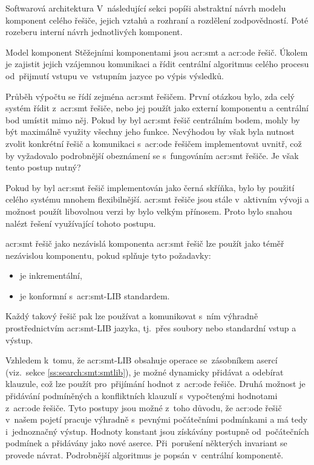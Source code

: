 \documentclass[thesis=M,czech]{FITthesis}[2012/06/26]
\newcommand{\acrlabel}[1]{acr:#1}
\newcommand{\acr}[1]{\acrshort{\acrlabel{#1}}}
\newcommand{\rf}[1]{\ref{#1}}
\begin{document}
\begin{section}{Softwarová architektura}\label{s:design:arch}
V~následující sekci popíši abstraktní návrh
modelu komponent celého řešiče,
jejich vztahů a rozhraní a rozdělení zodpovědností.
Poté rozeberu interní návrh jednotlivých komponent.


\begin{subsection}{Model komponent}\label{ss:design:arch:comp}
Stěžejními komponentami jsou \acr{smt} a \acr{ode} řešič.
Úkolem je zajistit jejich vzájemnou komunikaci
a řídit centrální algoritmus celého procesu
od~přijmutí vstupu ve~vstupním jazyce po výpis výsledků.

Průběh výpočtu se řídí zejména \acr{smt} řešičem.
První otázkou bylo, zda celý systém řídit
z~\acr{smt} řešiče, nebo jej použít jako externí komponentu
a centrální bod umístit mimo něj.
Pokud by byl \acr{smt} řešič centrálním bodem,
mohly by být maximálně využity všechny jeho funkce.
Nevýhodou by však byla nutnost
zvolit konkrétní řešič
a komunikaci s~\acr{ode} řešičem
implementovat uvnitř,
což by vyžadovalo podrobnější obeznámení se
s~fungováním \acr{smt} řešiče.
Je však tento postup nutný?

Pokud by byl \acr{smt} řešič
implementován jako černá skříňka,
bylo by použití celého systému mnohem flexibilnější.
\acr{smt} řešiče jsou stále v~aktivním vývoji
a možnost použít libovolnou verzi
by bylo velkým přínosem.
Proto bylo snahou nalézt řešení
využívající tohoto postupu.


\begin{subsubsection}{\acr{smt} řešič jako nezávislá komponenta}
\label{sss:design:arch:comp:smt}
\acr{smt} řešič lze použít
jako téměř nezávislou komponentu,
pokud splňuje tyto požadavky:
\begin{itemize}
\item je inkrementální,
\item je konformní s~\acr{smt}-LIB standardem.
\end{itemize}
Každý takový řešič pak lze používat
a komunikovat s~ním výhradně prostřednictvím
\acr{smt}-LIB jazyka,
tj.~přes soubory nebo standardní vstup a výstup.

Vzhledem k~tomu, že \acr{smt}-LIB
obsahuje operace se~zásobníkem asercí
(viz.~sekce \rf{ss:search:smt:smtlib}),
je možné dynamicky přidávat a odebírat
klauzule, což lze použít
pro~přijímání hodnot z~\acr{ode} řešiče.
Druhá možnost je přidávání
podmíněných a konfliktních klauzulí
s~vypočtenými hodnotami z~\acr{ode} řešiče.
Tyto postupy jsou možné z~toho důvodu,
že \acr{ode} řešič v~našem pojetí
pracuje výhradně s~pevnými počátečními podmínkami
a má tedy i~jednoznačný výstup.
Hodnoty konstant jsou získávány postupně
od~počátečních podmínek a přidávány jako nové aserce.
Při~porušení některých invariant
se provede návrat.
Podrobnější algoritmus je popsán
v~centrální komponentě.


\end{subsubsection}
\end{subsection}
\end{section}
\end{document}
